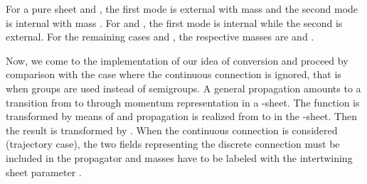 \documentclass[12pt,a4paper]{article}
\begin{document}
For a pure sheet \coordHE{} and \coordHE{}, the first mode is external with mass \coordHE{} and the second mode
is internal with mass \myHighlight{$\mu$}\coordHE{}. For \coordHE{} and \coordHE{}, the first mode is internal while the
second is external. For the remaining cases \coordHE{} and \coordHE{}, the respective
masses are \coordHE{} and \myHighlight{$\left(  \mu,\mu\right)  $}\coordHE{}.

Now, we come to the implementation of our idea of conversion and proceed by
comparison with the case where the continuous connection is ignored, that is
when groups are used instead of semigroups. A general propagation amounts to a
transition from \coordHE{} to
\coordHE{} through momentum representation in a
\coordHE{}-sheet. \cite{Smida 2001} The function \coordHE{} is transformed by means of
\coordHE{} and
propagation is realized from \coordHE{} to \coordHE{} in the \coordHE{}-sheet. Then the result is transformed by \coordHE{}. When the continuous connection is considered
(trajectory case), the two \coordHE{} fields representing the discrete connection
must be included in the propagator and masses have to be labeled with the
intertwining sheet parameter \coordHE{}.
\end{document}
